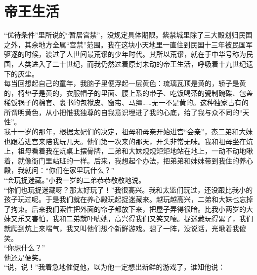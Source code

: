 \fancyhead[RO]{} %
\fancyhead[LE]{} %
\chapter*{帝王生活}
\thispagestyle{empty}
“优待条件”里所说的“暂居宫禁”，没规定具体期限。紫禁城里除了三大殿划归民国之外，其余地方全属“宫禁”范围。我在这块小天地里一直住到民国十三年被民国军驱逐的时候，渡过了人世间最荒谬的少年时代。其所以荒谬，就在于中华号称为民国，人类进入了二十世纪，而我仍然过着原封未动的帝王生活，呼吸着十九世纪遗下的灰尘。\\

每当回想起自己的童年，我脑子里便浮起一层黄色：琉璃瓦顶是黄的，轿子是黄的，椅垫子是黄的，衣服帽子的里面、腰上系的带子、吃饭喝茶的瓷制碗碟、包盖稀饭锅子的棉套、裹书的包袱皮、窗帘、马缰……无一不是黄的。这种独家占有的所谓明黄色，从小把惟我独尊的自我意识埋进了我的心底，给了我与众不同的“天性”。\\

我十一岁的那年，根据太妃们的决定，祖母和母亲开始进宫“会亲”，杰二弟和大妹也跟着进宫来陪我玩几天。他们第一次来的那天，开头非常无味。我和祖母坐在炕上，祖母看着我在炕桌上摆骨牌，二弟和大妹规规矩矩地站在地上，一动不动地瞅着，就像衙门里站班的一样。后来，我想起个办法，把弟弟和妹妹带到我住的养心殿，我就问：“你们在家里玩什么？”\\

“会玩捉迷藏。”小我一岁的二弟恭恭敬敬地说。\\

“你们也玩捉迷藏呀？那太好玩了！”我很高兴。我和太监们玩过，还没跟比我小的孩子玩过呢。于是我们就在养心殿玩起捉迷藏来。越玩越高兴，二弟和大妹也忘掉了拘束。后来我们索性把外面的帘子都放下来，把屋子弄得很暗。比我小两岁的大妹又乐又害怕，我和二弟就吓唬她，高兴得我们又笑又嚷。捉迷藏玩得累了，我们就爬到炕上来喘气，我又叫他们想个新鲜游戏。想了一阵，没说话，光瞅着我傻笑。\\

“你想什么？”\\

他还是便笑。\\

“说，说！”我着急地催促他，以为他一定想出新鲜的游戏了，谁知他说：\\

